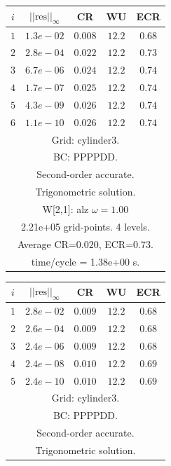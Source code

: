 \begin{table}[hbt]
\begin{center}
\begin{tabular}{|c|c|c|c|c|} \hline 
 $i$   & $\vert\vert\mbox{res}\vert\vert_\infty$  &  CR     &  WU    & ECR  \\   \hline 
 $ 1$  & $ 1.3e-02$ & $0.008$ & $12.2$ & $0.68$ \\ 
 $ 2$  & $ 2.8e-04$ & $0.022$ & $12.2$ & $0.73$ \\ 
 $ 3$  & $ 6.7e-06$ & $0.024$ & $12.2$ & $0.74$ \\ 
 $ 4$  & $ 1.7e-07$ & $0.025$ & $12.2$ & $0.74$ \\ 
 $ 5$  & $ 4.3e-09$ & $0.026$ & $12.2$ & $0.74$ \\ 
 $ 6$  & $ 1.1e-10$ & $0.026$ & $12.2$ & $0.74$ \\ 
\hline 
\multicolumn{5}{|c|}{Grid: cylinder3.}  \\
\multicolumn{5}{|c|}{BC: PPPPDD.}  \\
\multicolumn{5}{|c|}{Second-order accurate.}  \\
\multicolumn{5}{|c|}{Trigonometric solution.}  \\
\multicolumn{5}{|c|}{W[2,1]: alz $\omega=1.00$}  \\
\multicolumn{5}{|c|}{2.21e+05 grid-points. 4 levels.}  \\
\multicolumn{5}{|c|}{Average CR=$0.020$, ECR=$0.73$.}  \\
\multicolumn{5}{|c|}{time/cycle = 1.38e+00 s.}  \\
\hline 
\end{tabular}
\qquad
\begin{tabular}{|c|c|c|c|c|} \hline 
 $i$   & $\vert\vert\mbox{res}\vert\vert_\infty$  &  CR     &  WU    & ECR  \\   \hline 
 $ 1$  & $ 2.8e-02$ & $0.009$ & $12.2$ & $0.68$ \\ 
 $ 2$  & $ 2.6e-04$ & $0.009$ & $12.2$ & $0.68$ \\ 
 $ 3$  & $ 2.4e-06$ & $0.009$ & $12.2$ & $0.68$ \\ 
 $ 4$  & $ 2.4e-08$ & $0.010$ & $12.2$ & $0.69$ \\ 
 $ 5$  & $ 2.4e-10$ & $0.010$ & $12.2$ & $0.69$ \\ 
\hline 
\multicolumn{5}{|c|}{Grid: cylinder3.}  \\
\multicolumn{5}{|c|}{BC: PPPPDD.}  \\
\multicolumn{5}{|c|}{Second-order accurate.}  \\
\multicolumn{5}{|c|}{Trigonometric solution.}  \\

\end{tabular}
\end{center}
\end{table}
